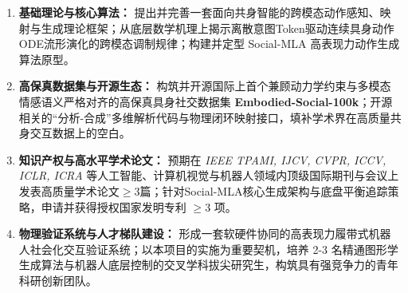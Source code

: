 \begin{enumerate}
    \item \textbf{基础理论与核心算法：} 提出并完善一套面向共身智能的跨模态动作感知、映射与生成理论框架；从底层数学机理上揭示离散意图Token驱动连续具身动作ODE流形演化的跨模态调制规律；构建并定型 Social-MLA 高表现力动作生成算法原型。
    \item \textbf{高保真数据集与开源生态：} 构筑并开源国际上首个兼顾动力学约束与多模态情感语义严格对齐的高保真具身社交数据集 \textbf{Embodied-Social-100k}；开源相关的“分析-合成”多维解析代码与物理闭环映射接口，填补学术界在高质量共身交互数据上的空白。
    \item \textbf{知识产权与高水平学术论文：} 预期在 \textit{IEEE TPAMI, IJCV, CVPR, ICCV, ICLR, ICRA} 等人工智能、计算机视觉与机器人领域内顶级国际期刊与会议上发表高质量学术论文$\geq$3篇；针对Social-MLA核心生成架构与底盘平衡追踪策略，申请并获得授权国家发明专利 $\geq$3 项。
    \item \textbf{物理验证系统与人才梯队建设：} 形成一套软硬件协同的高表现力履带式机器人社会化交互验证系统；以本项目的实施为重要契机，培养 2-3 名精通图形学生成算法与机器人底层控制的交叉学科拔尖研究生，构筑具有强竞争力的青年科研创新团队。
\end{enumerate}